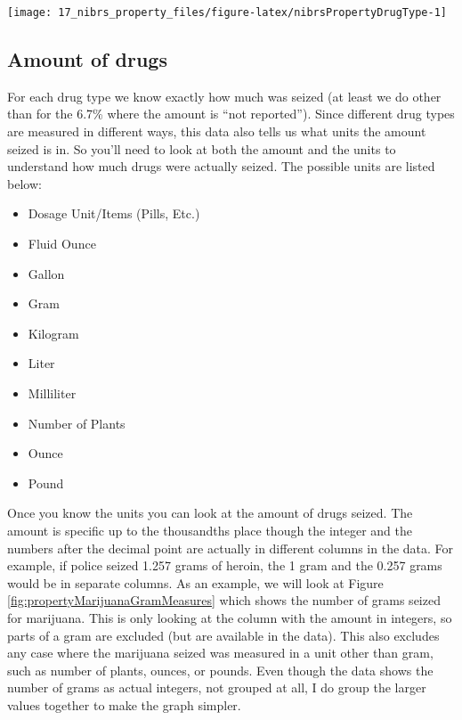 \documentclass[
]{krantz}
\providecommand{\tightlist}{%
  \setlength{\itemsep}{0pt}\setlength{\parskip}{0pt}}
\let\origfigure\figure
\let\endorigfigure\endfigure
\renewenvironment{figure}[1][2] {
    \expandafter\origfigure\expandafter[H]
} {
    \endorigfigure
}
\begin{document}
\begin{figure}

{\centering \texttt{[image: 17\_nibrs\_property\_files/figure-latex/nibrsPropertyDrugType-1]} 

}

\caption{Annual percent of drug seizures by drug type, for the 1st drug reported, 1991-2022.}\label{fig:nibrsPropertyDrugType}
\end{figure}

\subsection{Amount of drugs}\label{amount-of-drugs}

For each drug type we know exactly how much was seized (at
least we do other than for the 6.7\% where the amount is
``not reported''). Since different drug types are measured
in different ways, this data also tells us what units the
amount seized is in. So you'll need to look at both the
amount and the units to understand how much drugs were
actually seized. The possible units are listed below:

\begin{itemize}
\tightlist
\item
  Dosage Unit/Items (Pills, Etc.)
\item
  Fluid Ounce
\item
  Gallon\\
\item
  Gram
\item
  Kilogram\\
\item
  Liter\\
\item
  Milliliter
\item
  Number of Plants\\
\item
  Ounce
\item
  Pound
\end{itemize}

Once you know the units you can look at the amount of drugs
seized. The amount is specific up to the thousandths place
though the integer and the numbers after the decimal point
are actually in different columns in the data. For example,
if police seized 1.257 grams of heroin, the 1 gram and the
0.257 grams would be in separate columns. As an example, we
will look at Figure \ref{fig:propertyMarijuanaGramMeasures}
which shows the number of grams seized for marijuana. This
is only looking at the column with the amount in integers,
so parts of a gram are excluded (but are available in the
data). This also excludes any case where the marijuana
seized was measured in a unit other than gram, such as
number of plants, ounces, or pounds. Even though the data
shows the number of grams as actual integers, not grouped at
all, I do group the larger values together to make the graph
simpler.
\end{document}
